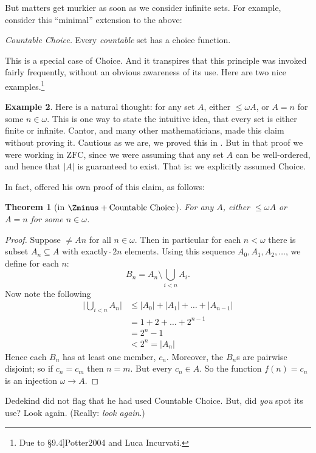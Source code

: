 \documentclass[10pt,a4paper]{article}
\makeatletter
\theoremstyle{plain}
\newtheorem{thm}{Theorem}[section]
\theoremstyle{definition}
\newtheorem{ex}[thm]{Example}
\theoremstyle{remark}
\newcommand{\olref}{\@ifnextchar[{\olref@i}{\olref@final}}
\def\olref@i[#1]{\@ifnextchar[{\olref@ii}{\olref@final}}
\def\olref@ii[#1]{\@ifnextchar[{\olref@iii}{\olref@final}}
\def\olref@iii[#1]{\olref@final}
\def\olref@final#1{\ref{#1}}
\providecommand{\cardexpo}{\mathbin{\hat{\ }}}
\providecommand{\cardle}{\leq}
\providecommand{\ZFC}{\mathrm{ZFC}}
\providecommand{\card}[1]{\lvert #1 \rvert}
\providecommand{\citet}[1]{\cite{#1}}
\providecommand{\cardneq}{\neq}
\providecommand{\cardeq}[2]{#1 = #2}
\makeatother
\begin{document}
But matters get murkier as soon as we consider infinite sets. For
example, consider this ``minimal'' extension to the above:

\begin{defish}
\emph{Countable Choice.} Every \emph{countable} set has a choice function. 
\end{defish}

This is a special case of Choice. And it transpires that this
principle was invoked fairly frequently, without  an obvious awareness
of its use. Here are two nice examples.\footnote{Due to
\citet[\S9.4]{Potter2004} and Luca Incurvati.}

\begin{ex}
Here is a natural thought: for any set $A$, either
$\cardle{\omega}{A}$, or $\cardeq{A}{n}$ for some $n \in \omega$. This
is one way to state the intuitive idea, that every set is either
finite or infinite. Cantor, and many other mathematicians, made this
claim without proving it. Cautious as we are, we proved this in
\olref[cardinals][classing]{generalinfinitycharacter}. But
in that proof we were working in $\ZFC$, since we were assuming that
any set $A$ can be well-ordered, and hence that $\card{A}$ is
guaranteed to exist. That is: we explicitly assumed Choice.

In fact, \citet{Dedekind1888} offered his own proof of
this claim, as follows:

\begin{thm}[in $\Zminus + \text{Countable Choice}$]
For any $A$, either $\cardle{\omega}{A}$ or $\cardeq{A}{n}$ for some
$n \in \omega$.
\end{thm}

\begin{proof}
Suppose $\cardneq{A}{n}$ for all $n \in \omega$. Then in particular
for each $n < \omega$ there is subset $A_n \subseteq A$ with exactly
$\cardexpo{2}{n}$ elements. Using this sequence $A_0, A_1, A_2,
\ldots$, we define for each $n$:
\[
	B_n = A_n \setminus \bigcup_{i < n} A_i.
\]
Now note the following
\begin{align*}
	\card{\bigcup_{i < n}A_n} 
	&\leq \card{A_0} + \card{A_1} + \ldots + \card{A_{n-1}}\\
	&=1 + 2 + \ldots + 2^{n-1}\\
	& = 2^n - 1\\
	& < 2^n = \card{A_n}
\end{align*}
Hence each $B_n$ has at least one member, $c_n$. Moreover, the $B_n$s
are pairwise disjoint; so if $c_n = c_m$ then $n = m$. But every $c_n
\in A$. So the function  $f(n) = c_n$ is an injection $\omega \to A$.
\end{proof}
\noindent 
Dedekind did not flag that he had used Countable Choice. But, did
\emph{you} spot its use? Look again. (Really: \emph{look again}.)


\end{ex}
\end{document}
